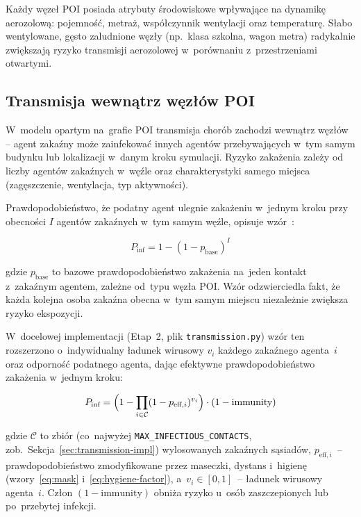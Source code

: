 \documentclass[polish]{projectreport}
\begin{document}
Każdy węzeł POI posiada atrybuty środowiskowe wpływające na dynamikę
aerozolową: pojemność, metraż, współczynnik wentylacji oraz temperaturę.
Słabo wentylowane, gęsto zaludnione węzły (np.\ klasa szkolna, wagon metra)
radykalnie zwiększają ryzyko transmisji aerozolowej w~porównaniu
z~przestrzeniami otwartymi.

\subsection{Transmisja wewnątrz węzłów POI}
\label{sec:poi-transmission}

W~modelu opartym na~grafie POI transmisja chorób zachodzi wewnątrz węzłów --
agent zakaźny może zainfekować innych agentów przebywających w~tym samym
budynku lub lokalizacji w~danym kroku symulacji. Ryzyko zakażenia zależy od
liczby agentów zakaźnych w~węźle oraz charakterystyki samego miejsca
(zagęszczenie, wentylacja, typ aktywności).

Prawdopodobieństwo, że podatny agent ulegnie zakażeniu w~jednym kroku przy
obecności $I$ agentów zakaźnych w~tym samym węźle, opisuje
wzór~\cite{eubank2004modelling}:

\begin{equation}
  P_{\text{inf}} = 1 - (1 - p_{\text{base}})^{I}
  \label{eq:poi-inf}
\end{equation}

\noindent gdzie $p_{\text{base}}$ to bazowe prawdopodobieństwo zakażenia
na~jeden kontakt z~zakaźnym agentem, zależne od~typu węzła POI.
Wzór odzwierciedla fakt, że każda kolejna osoba zakaźna obecna w~tym
samym miejscu niezależnie zwiększa ryzyko ekspozycji.

W~docelowej implementacji (Etap~2, plik \texttt{transmission.py}) wzór ten
rozszerzono o~indywidualny ładunek wirusowy $v_i$ każdego zakaźnego agenta~$i$
oraz odporność podatnego agenta, dając efektywne prawdopodobieństwo zakażenia
w~jednym kroku:

\begin{equation}
  P_{\text{inf}} = \Bigl(1 - \prod_{i \in \mathcal{C}} (1 - p_{\text{eff},i})^{v_i}\Bigr)
                   \cdot (1 - \text{immunity})
  \label{eq:poi-inf-impl}
\end{equation}

\noindent gdzie $\mathcal{C}$ to zbiór (co~najwyżej \texttt{MAX\_INFECTIOUS\_CONTACTS},
zob.\ Sekcja~\ref{sec:transmission-impl}) wylosowanych zakaźnych sąsiadów,
$p_{\text{eff},i}$~-- prawdopodobieństwo zmodyfikowane przez maseczki, dystans
i~higienę (wzory~\eqref{eq:mask} i~\eqref{eq:hygiene-factor}), a~$v_i \in [0,1]$~--
ładunek wirusowy agenta~$i$. Człon $(1-\text{immunity})$ obniża ryzyko
u~osób zaszczepionych lub po~przebytej infekcji.
\end{document}
